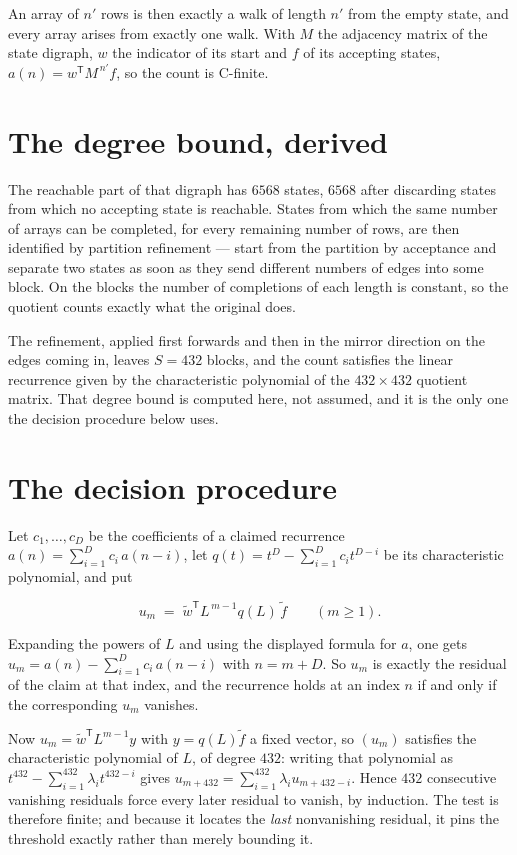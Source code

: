 \documentclass[11pt]{article}
\theoremstyle{definition}
\begin{document}
An array of $n'$ rows is then exactly a walk of length $n'$ from the empty state, and every array arises from exactly one walk. With $M$ the adjacency matrix of the state digraph, $w$ the indicator of its start and $f$ of its accepting states, $a(n) = w^{\mathsf T}M^{\,n'}f$, so the count is C-finite.

\section{The degree bound, derived}

The reachable part of that digraph has $6568$ states, $6568$ after discarding states from which no accepting state is reachable. States from which the same number of arrays can be completed, for every remaining number of rows, are then identified by partition refinement --- start from the partition by acceptance and separate two states as soon as they send different numbers of edges into some block. On the blocks the number of completions of each length is constant, so the quotient counts exactly what the original does.

The refinement, applied first forwards and then in the mirror direction on the edges coming in, leaves $S = 432$ blocks, and the count satisfies the linear recurrence given by the characteristic polynomial of the $432 \times 432$ quotient matrix. That degree bound is computed here, not assumed, and it is the only one the decision procedure below uses.

\section{The decision procedure}

Let $c_1,\dots,c_D$ be the coefficients of a claimed recurrence $a(n) = \sum_{i=1}^{D} c_i\,a(n-i)$, let $q(t) = t^{D} - \sum_{i=1}^{D} c_i t^{D-i}$ be its characteristic polynomial, and put

\[u_m \;=\; \tilde w^{\mathsf T} L^{\,m-1} q(L)\,\tilde f \qquad (m \ge 1).\]

Expanding the powers of $L$ and using the displayed formula for $a$, one gets $u_m = a(n) - \sum_{i=1}^{D} c_i\,a(n-i)$ with $n = m + D$. So $u_m$ is exactly the residual of the claim at that index, and the recurrence holds at an index $n$ if and only if the corresponding $u_m$ vanishes.

Now $u_m = \tilde w^{\mathsf T} L^{m-1} y$ with $y = q(L)\tilde f$ a fixed vector, so $(u_m)$ satisfies the characteristic polynomial of $L$, of degree $432$: writing that polynomial as $t^{432} - \sum_{i=1}^{432} \lambda_i t^{432-i}$ gives $u_{m+432} = \sum_{i=1}^{432} \lambda_i u_{m+432-i}$. Hence $432$ consecutive vanishing residuals force every later residual to vanish, by induction. The test is therefore finite; and because it locates the {\itshape last} nonvanishing residual, it pins the threshold exactly rather than merely bounding it.
\end{document}
